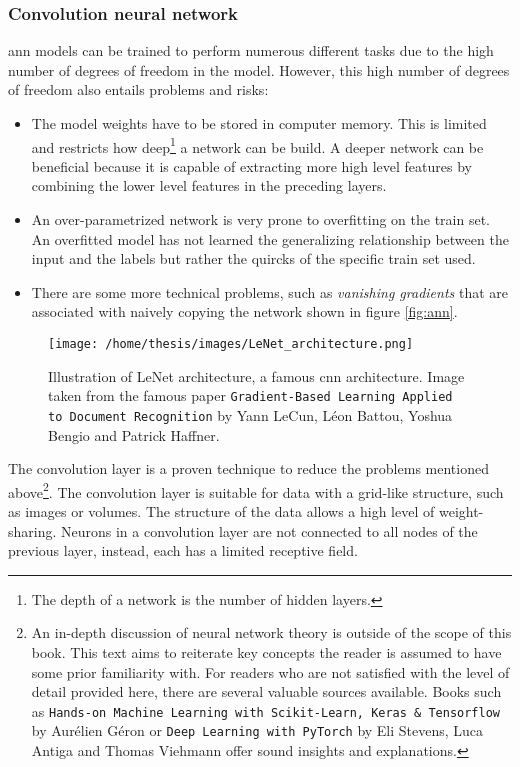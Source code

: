 \subsubsection{Convolution neural network}

\acrshort{ann} models can be trained to perform numerous different tasks due to the high number of degrees of freedom in the model.
However, this high number of degrees of freedom also entails problems and risks:

\begin{itemize}
    \item The model weights have to be stored in computer memory. 
    This is limited and restricts how deep\footnote{The depth of a network is the number of hidden layers.} a network can be build.
    A deeper network can be beneficial because it is capable of extracting more high level features by combining the lower level features in the preceding layers. 
    \item An over-parametrized network is very prone to overfitting on the train set. 
    An overfitted model has not learned the generalizing relationship between the input and the labels but rather the quircks of the specific train set used.
    \item There are some more technical problems, such as \textit{vanishing gradients} that are associated with naively copying the network shown in figure \ref{fig:ann}. 
\end{itemize}
\begin{SCfigure}[][h!]
    \centering
    \texttt{[image: /home/thesis/images/LeNet\_architecture.png]}
    \caption{
        Illustration of LeNet architecture, a famous \Gls{cnn} architecture.
        Image taken from the famous paper \texttt{Gradient-Based Learning Applied to Document Recognition} by Yann LeCun, Léon Battou, Yoshua Bengio and Patrick Haffner.
        }
\end{SCfigure}

The convolution layer is a proven technique to reduce the problems mentioned above\footnote{
    An in-depth discussion of neural network theory is outside of the scope of this book.
    This text aims to reiterate key concepts the reader is assumed to have some prior familiarity with.
    For readers who are not satisfied with the level of detail provided here, there are several valuable sources available.
    Books such as \texttt{Hands-on Machine Learning with Scikit-Learn, Keras \& Tensorflow} by Aurélien Géron or \texttt{Deep Learning with PyTorch} by Eli Stevens, Luca Antiga and Thomas Viehmann offer sound insights and explanations.
}.
The convolution layer is suitable for data with a grid-like structure, such as images or volumes.
The structure of the data allows a high level of weight-sharing. 
Neurons in a convolution layer are not connected to all nodes of the previous layer, instead, each has a limited receptive field.




